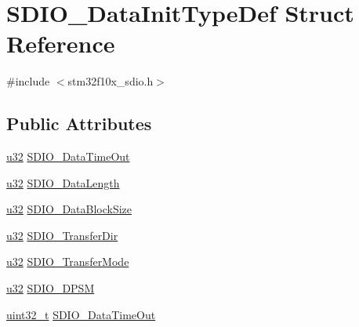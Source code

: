 \hypertarget{struct_s_d_i_o___data_init_type_def}{}\section{S\+D\+I\+O\+\_\+\+Data\+Init\+Type\+Def Struct Reference}
\label{struct_s_d_i_o___data_init_type_def}


{\ttfamily \#include $<$stm32f10x\+\_\+sdio.\+h$>$}

\subsection*{Public Attributes}
\begin{DoxyCompactItemize}
\item 
\hyperlink{agilefox_2library_2inc_2stm32f10x__type_8h_a2caf5cd7bcdbe1eefa727f44ffb10bac}{u32} \hyperlink{struct_s_d_i_o___data_init_type_def_a3580856d1890da4c1097abcc0370135c}{S\+D\+I\+O\+\_\+\+Data\+Time\+Out}
\item 
\hyperlink{agilefox_2library_2inc_2stm32f10x__type_8h_a2caf5cd7bcdbe1eefa727f44ffb10bac}{u32} \hyperlink{struct_s_d_i_o___data_init_type_def_a847bf42d7a20a2df38bfc296904ead36}{S\+D\+I\+O\+\_\+\+Data\+Length}
\item 
\hyperlink{agilefox_2library_2inc_2stm32f10x__type_8h_a2caf5cd7bcdbe1eefa727f44ffb10bac}{u32} \hyperlink{struct_s_d_i_o___data_init_type_def_aa20c2fbb862f96597c876de6649d011d}{S\+D\+I\+O\+\_\+\+Data\+Block\+Size}
\item 
\hyperlink{agilefox_2library_2inc_2stm32f10x__type_8h_a2caf5cd7bcdbe1eefa727f44ffb10bac}{u32} \hyperlink{struct_s_d_i_o___data_init_type_def_ae05c00dfb0721f2709db0062cd485d1d}{S\+D\+I\+O\+\_\+\+Transfer\+Dir}
\item 
\hyperlink{agilefox_2library_2inc_2stm32f10x__type_8h_a2caf5cd7bcdbe1eefa727f44ffb10bac}{u32} \hyperlink{struct_s_d_i_o___data_init_type_def_acc370a3377858d8ebeb9702f5decf6d8}{S\+D\+I\+O\+\_\+\+Transfer\+Mode}
\item 
\hyperlink{agilefox_2library_2inc_2stm32f10x__type_8h_a2caf5cd7bcdbe1eefa727f44ffb10bac}{u32} \hyperlink{struct_s_d_i_o___data_init_type_def_a0de3d8b89bfffea23524f83ebb824438}{S\+D\+I\+O\+\_\+\+D\+P\+SM}
\item 
\hyperlink{_p_e___types_8h_a33594304e786b158f3fb30289278f5af}{uint32\+\_\+t} \hyperlink{struct_s_d_i_o___data_init_type_def_a6877ec1042a273e228114e5362b93aa1}{S\+D\+I\+O\+\_\+\+Data\+Time\+Out}
\item 

\end{DoxyCompactItemize}
